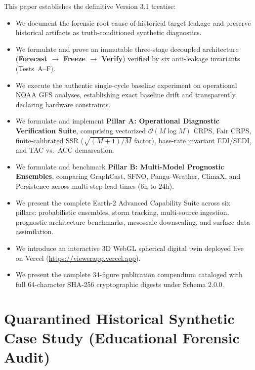 \documentclass[10pt,twocolumn,letterpaper]{article}
\begin{document}
This paper establishes the definitive Version 3.1 treatise:
\begin{itemize}
    \item We document the forensic root cause of historical target leakage and preserve historical artifacts as truth-conditioned synthetic diagnostics.
    \item We formulate and prove an immutable three-stage decoupled architecture (\textbf{Forecast $\to$ Freeze $\to$ Verify}) verified by six anti-leakage invariants (Tests~A--F).
    \item We execute the authentic single-cycle baseline experiment on operational NOAA GFS analyses, establishing exact baseline drift and transparently declaring hardware constraints.
    \item We formulate and implement \textbf{Pillar A: Operational Diagnostic Verification Suite}, comprising vectorized $\mathcal{O}(M \log M)$ CRPS, Fair CRPS, finite-calibrated SSR ($\sqrt{(M+1)/M}$ factor), base-rate invariant EDI/SEDI, and TAC vs.\ ACC demarcation.
    \item We formulate and benchmark \textbf{Pillar B: Multi-Model Prognostic Ensembles}, comparing GraphCast, SFNO, Pangu-Weather, ClimaX, and Persistence across multi-step lead times ($6\text{h}$ to $24\text{h}$).
    \item We present the complete Earth-2 Advanced Capability Suite across six pillars: probabilistic ensembles, storm tracking, multi-source ingestion, prognostic architecture benchmarks, mesoscale downscaling, and surface data assimilation.
    \item We introduce an interactive 3D WebGL spherical digital twin deployed live on Vercel (\url{https://viewerapp.vercel.app}).
    \item We present the complete 34-figure publication compendium cataloged with full 64-character SHA-256 cryptographic digests under Schema 2.0.0.
\end{itemize}

\section{Quarantined Historical Synthetic Case Study (Educational Forensic Audit)}
\end{document}
